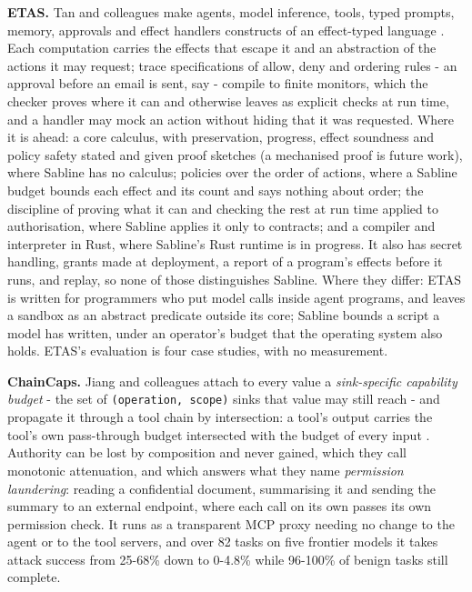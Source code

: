 \documentclass[
]{article}
\newcounter{none} %
\begin{document}
\textbf{ETAS.} Tan and colleagues make agents, model inference, tools,
typed prompts, memory, approvals and effect handlers constructs of an
effect-typed language \citep{tan2026etas}. Each computation carries the
effects that escape it and an abstraction of the actions it may request;
trace specifications of allow, deny and ordering rules - an approval
before an email is sent, say - compile to finite monitors, which the
checker proves where it can and otherwise leaves as explicit checks at
run time, and a handler may mock an action without hiding that it was
requested. Where it is ahead: a core calculus, with preservation,
progress, effect soundness and policy safety stated and given proof
sketches (a mechanised proof is future work), where Sabline has no
calculus; policies over the order of actions, where a Sabline budget
bounds each effect and its count and says nothing about order; the
discipline of proving what it can and checking the rest at run time
applied to authorisation, where Sabline applies it only to contracts;
and a compiler and interpreter in Rust, where Sabline's Rust runtime is
in progress. It also has secret handling, grants made at deployment, a
report of a program's effects before it runs, and replay, so none of
those distinguishes Sabline. Where they differ: ETAS is written for
programmers who put model calls inside agent programs, and leaves a
sandbox as an abstract predicate outside its core; Sabline bounds a
script a model has written, under an operator's budget that the
operating system also holds. ETAS's evaluation is four case studies,
with no measurement.

\textbf{ChainCaps.} Jiang and colleagues attach to every value a
\emph{sink-specific capability budget} - the set of
\texttt{(operation,\ scope)} sinks that value may still reach - and
propagate it through a tool chain by intersection: a tool's output
carries the tool's own pass-through budget intersected with the budget
of every input \citep{jiang2026chaincaps}. Authority can be lost by
composition and never gained, which they call monotonic attenuation, and
which answers what they name \emph{permission laundering}: reading a
confidential document, summarising it and sending the summary to an
external endpoint, where each call on its own passes its own permission
check. It runs as a transparent MCP proxy needing no change to the agent
or to the tool servers, and over 82 tasks on five frontier models it
takes attack success from 25-68\% down to 0-4.8\% while 96-100\% of
benign tasks still complete.
\end{document}
